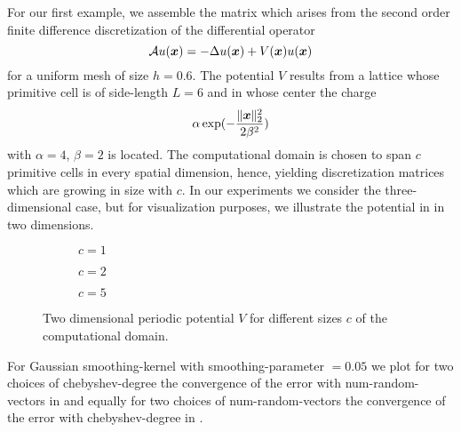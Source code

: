 For our first example, we assemble the matrix which arises from the second order
finite difference discretization of the differential operator
\begin{equation}
    \mathcal{A} u(\boldsymbol{x}) = - \Delta u(\boldsymbol{x}) + V(\boldsymbol{x}) u(\boldsymbol{x})
    \label{equ:5-experiments-electronic-hamiltonian}
\end{equation}
for a uniform mesh of size $h=0.6$. The potential $V$ results from a
lattice whose primitive cell is of side-length $L=6$ and in whose center the
charge
\begin{equation}
    \alpha \exp(-\frac{\lVert \boldsymbol{x} \rVert _2^2}{ 2 \beta^2 })
    \label{equ:5-experiments-gaussian-cell}
\end{equation}
with $\alpha = 4$, $\beta = 2$ is located. The computational domain is chosen
to span $c$ primitive cells in every spatial dimension, hence, yielding
discretization matrices which are growing in size with $c$. In our experiments
we consider the three-dimensional case, but for visualization purposes, we
illustrate the potential in 
in two dimensions.\\
\begin{figure}[ht]
    \begin{subfigure}[b]{0.33\columnwidth}
        
        \caption{$c=1$}
        \label{fig:5-experiments-periodic-gaussian-well-1}
    \end{subfigure}
    \begin{subfigure}[b]{0.33\columnwidth}
        
        \caption{$c=2$}
        \label{fig:5-experiments-periodic-gaussian-well-2}
    \end{subfigure}
    \begin{subfigure}[b]{0.33\columnwidth}
        
        \caption{$c=5$}
        \label{fig:5-experiments-periodic-gaussian-well-5}
    \end{subfigure}
    \caption{Two dimensional periodic potential $V$ for different sizes $c$ of the computational domain.}
    \label{fig:5-experiments-periodic-gaussian-well}
\end{figure}

For Gaussian \gls{smoothing-kernel} 
with \gls{smoothing-parameter} $=0.05$ we plot for two choices of \gls{chebyshev-degree}
the convergence of the error with \gls{num-random-vectors} in 
and equally for two choices of \gls{num-random-vectors} the convergence of the
error with \gls{chebyshev-degree} in .

